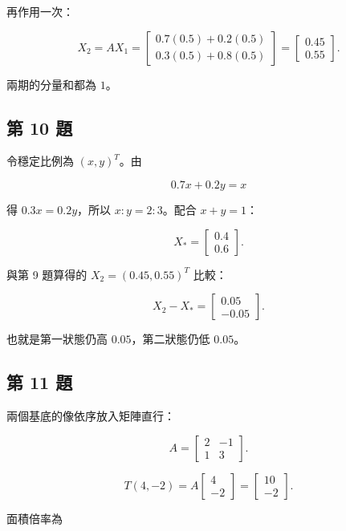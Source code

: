 \documentclass[11pt,a4paper]{article}
\begin{document}
再作用一次：

\[
X_2=AX_1
=
\begin{bmatrix}
0.7(0.5)+0.2(0.5)\\
0.3(0.5)+0.8(0.5)
\end{bmatrix}
=
\boxed{\begin{bmatrix}0.45\\0.55\end{bmatrix}}.
\]

兩期的分量和都為 \(1\)。

\clearpage

\subsection{第 10 題}\label{ux7b2c-10-ux984c}

令穩定比例為 \((x,y)^T\)。由

\[
0.7x+0.2y=x
\]

得 \(0.3x=0.2y\)，所以 \(x:y=2:3\)。配合 \(x+y=1\)：

\[
\boxed{X_*=\begin{bmatrix}0.4\\0.6\end{bmatrix}}.
\]

與第 9 題算得的 \(X_2=(0.45,0.55)^T\) 比較：

\[
X_2-X_*=
\begin{bmatrix}0.05\\-0.05\end{bmatrix}.
\]

也就是第一狀態仍高 \(0.05\)，第二狀態仍低 \(0.05\)。

\subsection{第 11 題}\label{ux7b2c-11-ux984c}

兩個基底的像依序放入矩陣直行：

\[
A=\boxed{\begin{bmatrix}2&-1\\1&3\end{bmatrix}}.
\]

\[
T(4,-2)
=
A\begin{bmatrix}4\\-2\end{bmatrix}
=
\boxed{\begin{bmatrix}10\\-2\end{bmatrix}}.
\]

面積倍率為
\end{document}
